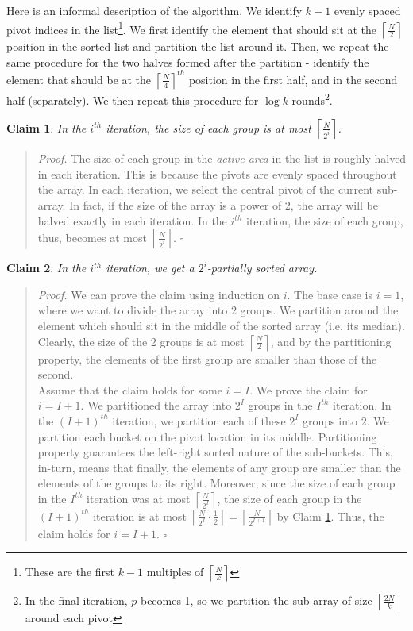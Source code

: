 \documentclass[9pt]{article}
\newtheorem{claim}{Claim}
\begin{document}
Here is an informal description of the algorithm. We identify $k-1$ evenly spaced pivot
indices in the list\footnote{These are the first $k-1$ multiples of $\left\lceil \frac{N}{k} \right\rceil$}.
We first identify the element that should sit at the $\left\lceil \frac{N}{2} \right\rceil$ position
in the sorted list and partition the list around it. Then, we repeat the same procedure for
the two halves formed after the partition - identify the element that should be at the
$\left\lceil \frac{N}{4} \right\rceil^{th}$ position in the first half, and in the second half (separately).
We then repeat this procedure for $\log{k}$ rounds\footnote{In the final iteration, $p$ becomes 1, so
we partition the sub-array of size $\left\lceil \frac{2N}{k} \right\rceil$ around each pivot}.
\begin{claim}
    \label{claim:k-partition-size}
    In the $i^{th}$ iteration, the size of each group is at most $\left\lceil \frac{N}{2^{i}} \right\rceil$.
\end{claim}
\begin{quote}
\textit{Proof.}
    The size of each group in the \textit{active area} in the list is roughly halved in each iteration. This is because
    the pivots are evenly spaced throughout the array. In each iteration, we select the central pivot of the
    current sub-array. In fact, if the size of the array is a power of $2$, the  array will be halved exactly in each iteration.
    In the $i^{th}$ iteration, the size of each group, thus, becomes at most $\left\lceil \frac{N}{2^{i}} \right\rceil$.
\hfill $\square$
\end{quote}
\begin{claim}
    \label{claim:k-partition}
    In the $i^{th}$ iteration, we get a $2^{i}$-partially sorted array.
\end{claim}
\begin{quote}
\textit{Proof.}
We can prove the claim using induction on $i$. The base case is $i = 1$, where we want to divide
the array into $2$ groups. We partition around the element which should sit in the middle of the
sorted array (i.e. its median). Clearly, the size of the 2 groups is at most $\left\lceil \frac{N}{2} \right\rceil$,
and by the partitioning property, the elements of the first group are smaller than those of the second. \\
Assume that the claim holds for some $i = I$. We prove the claim for $i = I+1$. We partitioned
the array into $2^{I}$ groups in the $I^{th}$ iteration. In the $(I+1)^{th}$ iteration, we partition
each of these $2^{I}$ groups into $2$. We partition each bucket on the pivot location in its middle.
Partitioning property guarantees the left-right sorted nature of the sub-buckets. This, in-turn, means
that finally, the elements of any group are smaller than the elements of the groups to its right.
Moreover, since the size of each group in the $I^{th}$ iteration was at most
$\left\lceil \frac{N}{2^{I}} \right\rceil$, the size of each group in the $(I+1)^{th}$ iteration
is at most $\left\lceil \frac{N}{2^{I}} \cdot \frac{1}{2} \right\rceil = \left\lceil \frac{N}{2^{I+1}} \right\rceil$
by Claim \ref{claim:k-partition-size}.
Thus, the claim holds for $i = I+1$.
\hfill $\square$
\end{quote}
\end{document}
